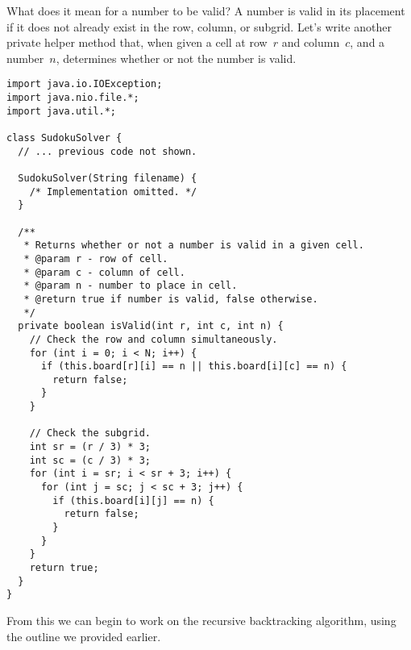 What does it mean for a number to be valid? 
A number is valid in its placement if it does not already exist in the row, column, or subgrid. 
Let's write another private helper method that, when given a cell at row~$r$ and column~$c$, and a number~$n$, determines whether or not the number is valid.

\begin{lstlisting}[language=MyJava]
import java.io.IOException;
import java.nio.file.*;
import java.util.*;

class SudokuSolver {
  // ... previous code not shown.

  SudokuSolver(String filename) { 
    /* Implementation omitted. */ 
  }

  /**
   * Returns whether or not a number is valid in a given cell.
   * @param r - row of cell.
   * @param c - column of cell.
   * @param n - number to place in cell.
   * @return true if number is valid, false otherwise.
   */ 
  private boolean isValid(int r, int c, int n) {
    // Check the row and column simultaneously.
    for (int i = 0; i < N; i++) {
      if (this.board[r][i] == n || this.board[i][c] == n) { 
        return false; 
      }
    }

    // Check the subgrid.
    int sr = (r / 3) * 3;
    int sc = (c / 3) * 3;
    for (int i = sr; i < sr + 3; i++) {
      for (int j = sc; j < sc + 3; j++) {
        if (this.board[i][j] == n) { 
          return false; 
        }
      }
    }
    return true;
  }
}
\end{lstlisting}

From this we can begin to work on the recursive backtracking algorithm, using the outline we provided earlier. 

